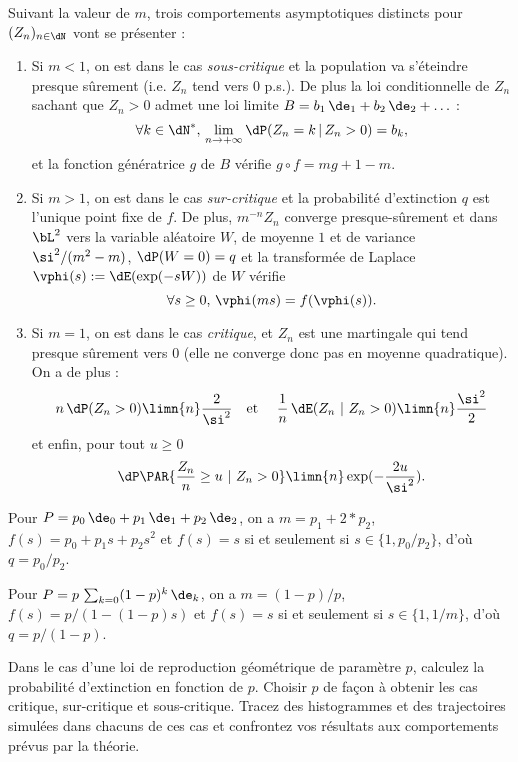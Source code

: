 {{Suivant la valeur de $m$, trois comportements asymptotiques distincts pour
$(Z_n)_{n\in\dN}$ vont se présenter :
\begin{enumerate}
\item Si $m<1$, on est dans le cas \emph{sous-critique} et la population va
  s'éteindre presque sûrement (i.e. $Z_n$ tend vers $0$ p.s.). De plus la loi
  conditionnelle de $Z_n$ sachant que $Z_n>0$ admet une loi limite
  $B=b_1\,\de_1+b_2\,\de_2+\ldots$ :
  $$
  \forall k\in\dN^*,\,\lim_{n\to+\infty} \dP(Z_n=k\,\vert\,Z_n>0) = b_k,
  $$
  et la fonction génératrice $g$ de $B$ vérifie $g\circ f=mg+1-m$.
\item Si $m >1$, on est dans le cas \emph{sur-critique} et la probabilité
  d'extinction $q$ est l'unique point fixe de $f$.  De plus, $m^{-n} Z_n$
  converge presque-sûrement et dans $\bL^2$ vers la variable aléatoire $W$, de
  moyenne $1$ et de variance $\si^2/(m^2-m)$, $\dP(W=0)=q$ et la transformée
  de Laplace $\vphi(s):=\dE(\exp(-sW))$ de $W$ vérifie
  $$
  \forall s\geq 0,\,\vphi(ms)=f(\vphi(s)).
  $$
\item Si $m =1$, on est dans le cas \emph{critique}, et $Z_n$ est une
  martingale qui tend presque sûrement vers $0$ (elle ne converge donc pas en
  moyenne quadratique). On a de plus :
  $$
   n\,\dP(Z_n>0) \limn{n} \frac{2}{\si^2}
   \text{\quad et \quad} 
   \frac{1}{n}\,\dE(Z_n\ |\ Z_n>0) \limn{n} \frac{\si^2}{2}
   $$
   et enfin, pour tout $u\geq 0$
  $$
  \dP\PAR{\frac{Z_n}{n} \geq u\ |\ Z_n>0} \limn{n} \exp(-\frac{2u}{\si^2}).
  $$
\end{enumerate}

Pour $P=p_0\,\de_0+p_1\,\de_1+p_2\,\de_2$, on a $m=p_1+2*p_2$,
$f(s)=p_0+p_1s+p_2s^2$ et $f(s)=s$ si et seulement si
$s\in\{1,p_0/p_2\}$, d'où $q=p_0/p_2$.

%
%

Pour $P=p\,\sum_{k=0} (1-p)^k\,\de_k$, on a $m=(1-p)/p$,
$f(s)=p/(1-(1-p)s)$ et $f(s)=s$ si et seulement si $s\in\{1,1/m\}$,
d'où $q=p/(1-p)$.

%
%

%
%

%
%

%
%

\begin{exo}
Dans le cas d'une loi de reproduction géométrique de paramètre $p$,
calculez la probabilité d'extinction en fonction de $p$. Choisir $p$
de façon à obtenir les cas critique, sur-critique et sous-critique.
Tracez des histogrammes et des trajectoires simulées dans chacuns de
ces cas et confrontez vos résultats aux comportements prévus par la
théorie.
\end{exo}

}}
